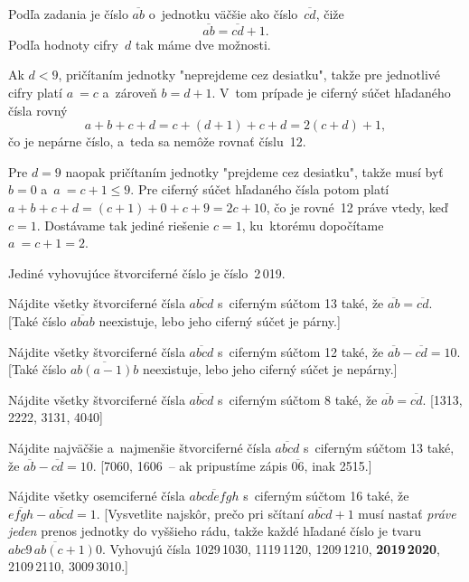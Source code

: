 {%
Podľa zadania je číslo $\overline {ab}$ o~jednotku väčšie
ako číslo~$\overline {cd}$, čiže
$$
\overline {ab} = \overline {cd}+1.
$$
Podľa hodnoty cifry~$d$ tak máme dve možnosti.

Ak $d<9$, pričítaním jednotky
"neprejdeme cez desiatku", takže pre jednotlivé cifry platí $a~= c$
a~zároveň $b = d+1$. V~tom prípade je ciferný súčet hľadaného čísla rovný
$$
a+b+c+d = c+(d+1)+c+d = 2 (c+d)+1,
$$
čo je nepárne číslo, a~teda sa nemôže rovnať číslu~12.

Pre $d = 9$ naopak pričítaním jednotky "prejdeme cez desiatku",
takže musí byť $b = 0$ a~$a~= c+1\le9$. Pre ciferný súčet hľadaného
čísla potom platí $a+b+c+d = ({c+1})+0+c+9=2c+10$, čo je rovné~12 práve vtedy, keď $c=1$.
Dostávame tak jediné riešenie $c = 1$, ku~ktorému dopočítame $a~= c+1 = 2$.

Jediné vyhovujúce štvorciferné číslo je číslo~2\,019.

Nájdite všetky štvorciferné čísla $\overline {abcd}$ s~ciferným súčtom
13 také, že $\overline {ab} = \overline {cd}$. [Také číslo $\overline{abab}$
neexistuje, lebo jeho ciferný súčet je párny.]

Nájdite všetky štvorciferné čísla $\overline {abcd}$ s~ciferným súčtom
12 také, že $\overline {ab}-\overline {cd} = 10$. [Také číslo $\overline{ab(a-1)b}$
neexistuje, lebo jeho ciferný súčet je nepárny.]

Nájdite všetky štvorciferné čísla $\overline {abcd}$ s~ciferným súčtom 8
také, že $\overline {ab} = \overline {cd}$. [1313, 2222, 3131, 4040]

\D
Nájdite najväčšie a~najmenšie štvorciferné čísla $\overline {abcd}$
s~ciferným súčtom 13 také, že $\overline {ab}-\overline {cd} = 10$. [7060,
1606~-- ak pripustíme zápis $\overline{06}$, inak 2515.]

Nájdite všetky osemciferné čísla $\overline {abcdefgh}$ s~ciferným
súčtom 16 také, že $\overline {efgh}-\overline {abcd} = 1$. [Vysvetlite najskôr,
prečo pri sčítaní $\overline{abcd}+1$ musí nastať {\it práve jeden\/} prenos jednotky
do vyššieho rádu, takže každé hľadané číslo je tvaru $\overline{abc9\,ab(c+1)0}$.
Vyhovujú čísla 1029\,1030,
1119\,1120, 1209\,1210, {\bf 2019\,2020}, 2109\,2110, 3009\,3010.]
}

